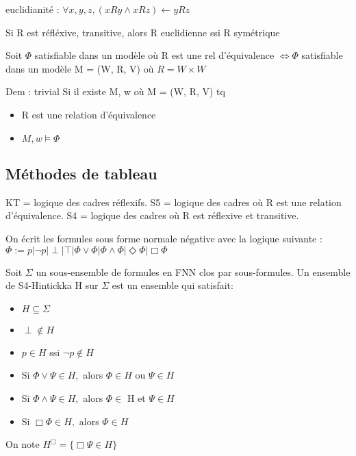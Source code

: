 \documentclass[10pt,a4paper]{article}
\begin{document}
euclidianité : $\forall x, y, z, (x R y \wedge xRz) \leftarrow y R z$

\begin{prop}
 Si R est réfléxive, transitive, alors R euclidienne ssi R symétrique
\end{prop}
\begin{prop}
Soit $\Phi$ satisfiable dans un modèle où R est une rel d'équivalence 
$\Leftrightarrow \Phi$ satisfiable dans un modèle M = (W, R, V) où $R = W \times W$
\end{prop}
Dem \fbox{$\Leftarrow$} : trivial
\fbox{$\Rightarrow$} Si il existe M, w où M  = (W, R, V) tq
\begin{itemize}
 \item R est une relation d'équivalence
 \item $M, w \models \Phi$
\end{itemize}





\subsection{Méthodes de tableau}

KT = logique des cadres réflexifs.
S5 = logique des cadres où R est une relation d'équivalence.
S4 = logique des cadres où R est réflexive et transitive.

On écrit les formules sous forme normale négative avec la logique suivante :\\
 $ \Phi := p | \lnot p | \perp | \top | \Phi \vee \Phi | \Phi \wedge \Phi | \Diamond \Phi | \Box \Phi $

\begin{definition}
 Soit $\Sigma$ un sous-ensemble de formules en FNN clos par sous-formules. Un ensemble de S4-Hintickka H sur $\Sigma$ est un ensemble qui satisfait:
\begin{itemize}
 \item $H \subseteq \Sigma$
 \item $\perp \not \in H$
 \item $p \in H$ ssi $\lnot p \not \in H$
 \item Si $\Phi\vee\Psi \in H,$ alors $\Phi \in H$ ou $\Psi \in H$
  \item Si $\Phi\wedge\Psi \in H,$ alors $\Phi \in$ H et $\Psi \in H$
  \item Si $\Box \Phi \in H,$ alors $\Phi \in H$
\end{itemize}
On note $H^{\Box} = \{\Box \Psi \in H \}$
\end{definition}
\end{document}
